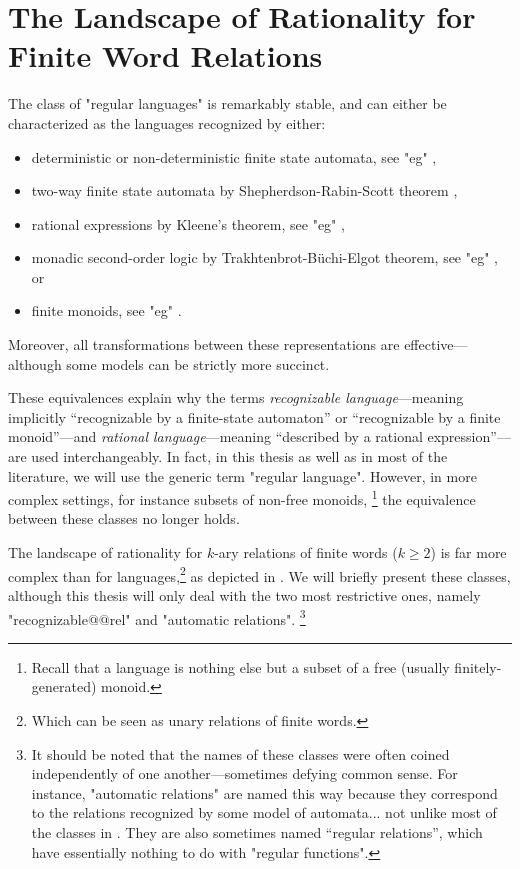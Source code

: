 \section{The Landscape of Rationality for Finite Word Relations}
\label{sec:preliminaries-automatic-structures-relations}

The class of "regular languages" is remarkably stable, and can either be characterized as the 
languages recognized by either:
\begin{itemize}
	\item deterministic or non-deterministic finite state automata,
	see "eg" \cite[Proposition~1.2.3, p.~7]{Pin2021FiniteAutomata},
	\item two-way finite state automata by Shepherdson-Rabin-Scott theorem
		\cite[Theorem~2, p.~198]{Shepherdson1959ReductionTwoWay}
		\cite[Theorem~15, p.~123]{RabinScott1959FiniteAutomata},
	\item rational expressions by Kleene's theorem,
		see "eg" \cite[Theorem~1.5.11, p.~34]{Pin2021FiniteAutomata},
	\item monadic second-order logic by Trakhtenbrot-Büchi-Elgot theorem,
		see "eg" \cite[Theorem~2.2, p.~32]{Bojanczyk2020MSO}, or
	\item finite monoids,
		see "eg" \cite[\S~1.4.2, p.~19]{Pin2021FiniteAutomata}.
\end{itemize}
Moreover, all transformations between these representations are effective---although some
models can be strictly more succinct.

These equivalences explain why the terms \emph{recognizable language}---meaning implicitly
``recognizable by a finite-state automaton'' or ``recognizable by a finite monoid''---and
\emph{rational language}---meaning ``described by a rational expression''---are used 
interchangeably. In fact, in this thesis as well as in most of the literature,
we will use the generic term "regular language".
However, in more complex settings, for instance subsets of non-free monoids,%
\footnote{Recall that a language is nothing else but a subset of a free
(usually finitely-generated) monoid.}
the equivalence between these classes no longer holds. \cite{Pin2021StackExchange}

The landscape of rationality for $k$-ary relations of finite words ($k \geq 2$) is far more complex than for languages,\footnote{Which can be seen as unary relations of finite words.} as depicted in . We will briefly present these classes,
although this thesis will only deal with the two most restrictive ones, namely
"recognizable@@rel" and "automatic relations".%
\footnote{It should be noted that the names
of these classes were often coined independently of one another---sometimes defying common sense.
For instance, "automatic relations" are named this way because they correspond to
the relations recognized by some model of automata...
not unlike most of the classes in .
They are also sometimes named ``regular relations'', which have essentially nothing to do
with "regular functions".}

